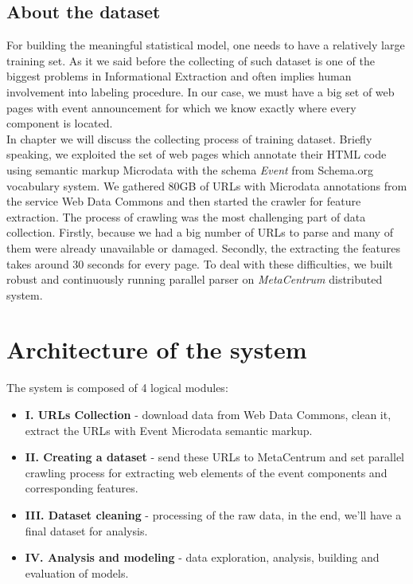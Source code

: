 \subsection*{About the dataset}
For building the meaningful statistical model, one needs to have a relatively large training set. As it we said before the collecting of such dataset is one of the biggest problems in Informational Extraction and often implies human involvement into labeling procedure. In our case, we must have a big set of web pages with event announcement for which we know exactly where every component is located.\\  

In chapter  we will discuss the collecting process of training dataset. Briefly speaking, we exploited the set of web pages which annotate their HTML code using semantic markup Microdata with the schema \textit{Event} from Schema.org vocabulary system. We gathered 80GB of URLs with Microdata annotations from the service Web Data Commons and then started the crawler for feature extraction. The process of crawling was the most challenging part of data collection. Firstly, because we had a big number of URLs to parse and many of them were already unavailable or damaged. Secondly, the extracting the features takes around 30 seconds for every page. To deal with these difficulties, we built robust and continuously running parallel parser on \textit{MetaCentrum} distributed system. 

\section{Architecture of the system}
\label{sec:arch}

The system is composed of 4 logical modules:

\begin{itemize}
    \item \textbf{I. URLs Collection} - download data from Web Data Commons, clean it, extract the URLs with Event Microdata semantic markup.
    \item \textbf{II. Creating a dataset} - send these URLs to MetaCentrum and set parallel crawling process for extracting web elements of the event components and corresponding features.
    \item \textbf{III. Dataset cleaning} - processing of the raw data, in the end, we'll have a final dataset for analysis.
    \item \textbf{IV. Analysis and modeling} - data exploration, analysis, building and evaluation of models.
\end{itemize}

